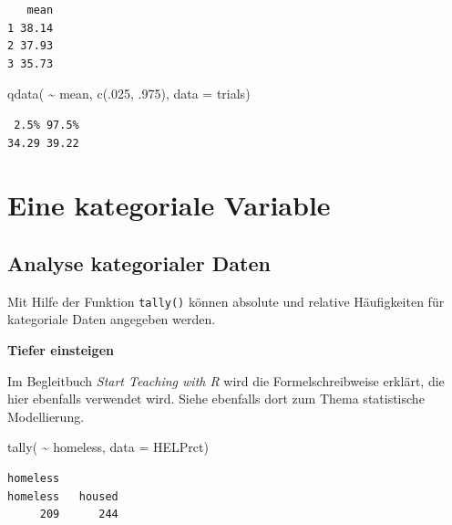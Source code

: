 \documentclass[
  ngerman,
]{scrbook}
\newenvironment{Shaded}{\begin{snugshade}}{\end{snugshade}}
\newcommand{\AttributeTok}[1]{\textcolor[rgb]{0.77,0.63,0.00}{#1}}
\newcommand{\DecValTok}[1]{\textcolor[rgb]{0.00,0.00,0.81}{#1}}
\newcommand{\FunctionTok}[1]{\textcolor[rgb]{0.00,0.00,0.00}{#1}}
\newcommand{\NormalTok}[1]{#1}
\newcommand{\SpecialCharTok}[1]{\textcolor[rgb]{0.00,0.00,0.00}{#1}}
\newenvironment{tiefereinsteigen}[1]
  {
  \begin{itemize}
  \renewcommand{\labelitemi}{
    \raisebox{2.6\height}[0pt][0pt]{
      {\setkeys{Gin}{width=7em,keepaspectratio}
        {\normalsize \textcolor{dark-fom-green}\faSearch}}
        }
  }
  \begin{blackbox}
         \bgroup\color{dark-fom-green}
          {\textbf{Tiefer einsteigen}}
        \egroup
  \item
  }
  {
  \end{blackbox}
  \end{itemize}
  }
\begin{document}
\begin{verbatim}
   mean
1 38.14
2 37.93
3 35.73
\end{verbatim}

\begin{Shaded}
\begin{Highlighting}[]
\FunctionTok{qdata}\NormalTok{( }\SpecialCharTok{\textasciitilde{}}\NormalTok{ mean, }\FunctionTok{c}\NormalTok{(.}\DecValTok{025}\NormalTok{, .}\DecValTok{975}\NormalTok{), }\AttributeTok{data =}\NormalTok{ trials)}
\end{Highlighting}
\end{Shaded}

\begin{verbatim}
 2.5% 97.5% 
34.29 39.22 
\end{verbatim}

\hypertarget{eine-kategoriale-variable}{%
\chapter{Eine kategoriale Variable}\label{eine-kategoriale-variable}}

\hypertarget{analyse-kategorialer-daten}{%
\section{Analyse kategorialer Daten}\label{analyse-kategorialer-daten}}

Mit Hilfe der Funktion \texttt{tally()} können absolute und relative Häufigkeiten für kategoriale Daten angegeben werden.

\begin{tiefereinsteigen}{tiefereinsteigen}
Im Begleitbuch \emph{Start Teaching with R} \autocite{TeachingR} wird die Formelschreibweise erklärt, die hier ebenfalls verwendet wird. Siehe ebenfalls dort zum Thema statistische Modellierung.

\end{tiefereinsteigen}

\begin{Shaded}
\begin{Highlighting}[]
\FunctionTok{tally}\NormalTok{( }\SpecialCharTok{\textasciitilde{}}\NormalTok{ homeless, }\AttributeTok{data =}\NormalTok{ HELPrct)}
\end{Highlighting}
\end{Shaded}

\begin{verbatim}
homeless
homeless   housed 
     209      244 
\end{verbatim}
\end{document}
